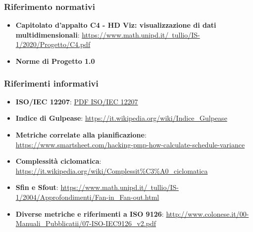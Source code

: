         \subsubsection{Riferimento normativi}
            \begin{itemize}
                \item \textbf{Capitolato d'appalto C4 - HD Viz: visualizzazione di dati multidimensionali}:
                \href{https://www.math.unipd.it/~tullio/IS-1/2020/Progetto/C4.pdf}{https://www.math.unipd.it/~tullio/IS-1/2020/Progetto/C4.pdf}
                \item \textbf{Norme di Progetto 1.0}
            \end{itemize}
            
        \subsubsection{Riferimenti informativi}
            \begin{itemize}
                \item \textbf{ISO/IEC 12207}:
                \href{https://www.math.unipd.it/~tullio/IS-1/2009/Approfondimenti/ISO_12207-1995.pdf}{PDF ISO/IEC 12207}
                \item \textbf{Indice di Gulpease}:
                \href{https://it.wikipedia.org/wiki/Indice\_Gulpease}{https://it.wikipedia.org/wiki/Indice\_Gulpease}
                \item \textbf{Metriche correlate alla pianificazione}:
                \href{https://www.smartsheet.com/hacking-pmp-how-calculate-schedule-variance}{https://www.smartsheet.com/hacking-pmp-how-calculate-schedule-variance}
                \item \textbf{Complessità ciclomatica}: \href{https://it.wikipedia.org/wiki/Complessit\%C3\%A0\_ciclomatica}{https://it.wikipedia.org/wiki/Complessit\%C3\%A0\_ciclomatica}
                \item \textbf{Sfin e Sfout}: \href{https://www.math.unipd.it/~tullio/IS-1/2004/Approfondimenti/Fan-in\_Fan-out.html}{https://www.math.unipd.it/~tullio/IS-1/2004/Approfondimenti/Fan-in\_Fan-out.html}
                \item \textbf{Diverse metriche e riferimenti a ISO 9126}: \href{http://www.colonese.it/00-Manuali\_Pubblicatii/07-ISO-IEC9126\_v2.pdf}{http://www.colonese.it/00-Manuali\_Pubblicatii/07-ISO-IEC9126\_v2.pdf}
            \end{itemize}
